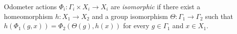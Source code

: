
Odometer actions $\Phi_i:\Gamma_i\times X_i\to X_i$ are \emph{isomorphic} if there exist a homeomorphism $h:X_1\to X_2$ and a group isomorphism $\Theta:\Gamma_1\to\Gamma_2$ such that $h(\Phi_1(g,x))=\Phi_2(\Theta(g),h(x))$ for every $g\in\Gamma_1$ and $x\in X_1$.

